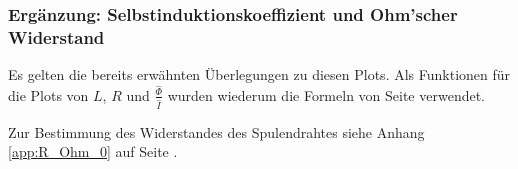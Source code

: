 {	\begin{minipage}[t]{0.33\textwidth}
        \vspace{0pt}
        \subsubsection{Erg\"anzung: Selbstinduktionskoeffizient und Ohm'scher Widerstand}
        \label{sec:ausw:subsec:hohlz:st:subsubsec:LR}

        Es   gelten  die   bereits   erw\"ahnten   \"Uberlegungen  zu   diesen
        Plots.    Als  Funktionen   f\"ur   die  Plots   von   $L$,  $R$   und
        $\frac{\hat{\Phi}}{\hat{I}}$  wurden wiederum  die  Formeln von  Seite
        \pageref{eq:hohlzylinder:phiNormExact} verwendet.

        Zur  Bestimmung  des  Widerstandes   des  Spulendrahtes  siehe  Anhang
        \ref{app:R_Ohm_0} auf Seite \pageref{app:R_Ohm_0}.

        \vspace{1em}
        \begin{minipage}[c][][b]{0.5\textwidth}
            \vspace{0pt}
            
        \end{minipage}%
        \begin{minipage}[c][][b]{0.5\textwidth}
            \vspace{0pt}
            
        \end{minipage}
	\end{minipage}%
	\begin{minipage}[t]{0.67\textwidth}
        \vspace{0pt}
        \resizebox{.95\textwidth}{!}{}
        \label{fig:st:freq:L}
        \resizebox{.95\textwidth}{!}{}
        \label{fig:st:freq:R}
	\end{minipage}

	\begin{minipage}[t]{0.33\textwidth}
        \vspace{0pt}


\end{minipage}}

